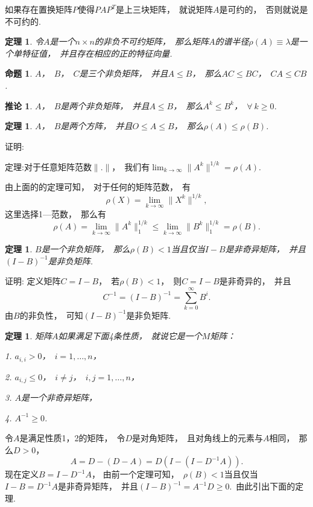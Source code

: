 \documentclass{article}
\begin{document}
如果存在置换矩阵$P$使得$PAP^T$是上三块矩阵，~就说矩阵$A$是可约的，~否则就说是不可约的.

\newtheorem{thm}{定理}
\begin{thm}
令$A$是一个$n\times n$的非负不可约矩阵，~那么矩阵$A$的谱半径$\rho (A)\equiv\lambda$是一个单特征值，~并且存在相应的正的特征向量.
\end{thm}

\newtheorem{proposition}{命题}
\begin{proposition}
$A$，~$B$，~$C$是三个非负矩阵，~并且$A\le B$，~那么$AC\le BC$，~$CA\le CB$.
\end{proposition}

\newtheorem{corollary}{推论}
\begin{corollary}
$A$，~$B$是两个非负矩阵，~并且$A\le B$，~那么$A^k\le B^k$，~$\forall ~k\ge 0$.
\end{corollary}

\newtheorem{thm}{定理}
\begin{thm}
$A$，~$B$是两个方阵，~并且$O\le A\le B$，~那么$\rho (A)\le\rho (B)$.
\end{thm}
证明:

定理:对于任意矩阵范数$\parallel .\parallel$，~我们有$\lim_{k \to \infty}\parallel A^k\parallel ^{1/k}=\rho (A).$

由上面的的定理可知，~对于任何的矩阵范数，~有$$\rho (X)=\lim_{k \to \infty}\parallel X^k\parallel ^{1/k},$$这里选择1—范数，~那么有$$\rho (A)=\lim_{k \to \infty}\parallel A^k\parallel ^{1/k}_1\le\lim_{k \to \infty}\parallel B^k\parallel ^{1/k}_1=\rho (B).$$


\newtheorem{thm}{定理}
\begin{thm}
$B$是一个非负矩阵，~那么$\rho (B)<1$当且仅当$I-B$是非奇异矩阵，~并且$(I-B)^{-1}$是非负矩阵.
\end{thm}
证明:
定义矩阵$C=I-B$，~若$\rho (B)<1$，~则$C=I-B$是非奇异的，~并且$$C^{-1}=(I-B)^{-1}=\sum_{k=0}^\infty B^i.$$由$B$的非负性，~可知$(I-B)^{-1}$是非负矩阵.

\newtheorem{definition}{定理}
\begin{definition}
矩阵$A$如果满足下面4条性质，~就说它是一个$M$矩阵：

1. $a_{i,i}>0$，~$i=1, \ldots ,n$，

2. $a_{i,j}\le 0$，~$i\neq j$，~$i,j=1,\ldots ,n$，

3. $A$是一个非奇异矩阵，

4. $A^{-1}\ge 0$.
\end{definition}

令$A$是满足性质1，2的矩阵，~令$D$是对角矩阵，~且对角线上的元素与$A$相同，~那么$D>0$，~$$A=D-(D-A)=D(I-(I-D^{-1}A)).$$现在定义$B=I-D^{-1}A$，
由前一个定理可知，~$\rho (B)<1$当且仅当$I-B=D^{-1}A$是非奇异矩阵，~并且$(I-B)^{-1}=A^{-1}D\ge 0$.~由此引出下面的定理.
\end{document}
